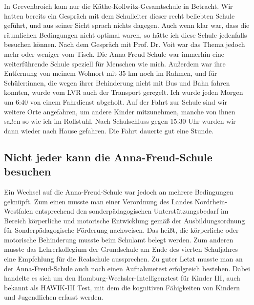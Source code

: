 \documentclass[fontsize=14pt,a4paper,headinclude,DIV=calc,automark]{scrbook}
\begin{document}
In Grevenbroich kam nur die Käthe-Kollwitz-Gesamtschule in Betracht. Wir hatten bereits ein Gespräch mit dem Schulleiter dieser recht beliebten Schule geführt, und aus seiner Sicht sprach nichts dagegen. Auch wenn klar war, dass die räumlichen Bedingungen nicht optimal waren, so hätte ich diese Schule jedenfalls besuchen können. Nach dem Gespräch mit Prof. Dr. Voit war das Thema jedoch mehr oder weniger vom Tisch. Die Anna-Freud-Schule war immerhin eine weiterführende Schule speziell für Menschen wie mich. Außerdem war ihre Entfernung von meinem Wohnort mit 35 km noch im Rahmen, und für Schüler:innen, die wegen ihrer Behinderung nicht mit Bus und Bahn fahren konnten, wurde vom LVR auch der Transport geregelt. Ich wurde jeden Morgen um 6:40 von einem Fahrdienst abgeholt. Auf der Fahrt zur Schule sind wir weitere Orte angefahren, um andere Kinder mitzunehmen, manche von ihnen saßen so wie ich im Rollstuhl. Nach Schulschluss gegen 15:30 Uhr wurden wir dann wieder nach Hause gefahren. Die Fahrt dauerte gut eine Stunde.

\subsection{Nicht jeder kann die Anna-Freud-Schule besuchen}

Ein Wechsel auf die Anna-Freud-Schule war jedoch an mehrere Bedingungen geknüpft. Zum einen musste man einer Verordnung des Landes Nord\-rhein-West\-fa\-len entsprechend den sonderpädagogischen Unterstützungsbedarf im Bereich körperliche und motorische Entwicklung gemäß der Ausbildungsordnung für Sonderpädagogische Förderung nachweisen. Das heißt, die körperliche oder motorische Behinderung musste beim Schulamt belegt werden. Zum anderen musste das Lehrerkollegium der Grundschule am Ende des vierten Schuljahres eine Empfehlung für die Realschule aussprechen. Zu guter Letzt musste man an der Anna-Freud-Schule auch noch einen Aufnahmetest erfolgreich bestehen. Dabei handelte es sich um den Hamburg-Wechsler-Intelligenztest für Kinder III, auch bekannt als HAWIK-III Test, mit dem die kognitiven Fähigkeiten von Kindern und Jugendlichen erfasst werden.
\end{document}
